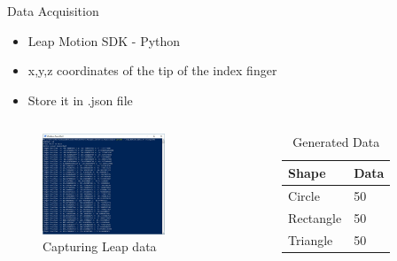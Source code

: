 \documentclass[10pt]{beamer}
\begin{document}
\begin{frame}[fragile]{Data Acquisition }
\begin{itemize}
\item Leap Motion SDK - Python
\item x,y,z coordinates of the tip of the index finger
\item Store it in .json file
\end{itemize}
\begin{columns}
  \begin{column}{0.4\textwidth}
\begin{figure}
\includegraphics[width=\textwidth, height = 3cm]{data_acquisition}
\caption{Capturing Leap data}

\end{figure}
\end{column}
  \begin{column}{0.5\textwidth}  %
 \begin{table}[]
\centering
\begin{tabular}{|l|l|}
\hline
\textbf{Shape }    & \textbf{Data} \\ \hline
Circle    & 50   \\ \hline
Rectangle & 50   \\ \hline
Triangle  & 50   \\ \hline
\end{tabular}
\caption{Generated Data}
\label{my-label}
\end{table}
  \end{column}
\end{columns}
\end{frame}
\end{document}
